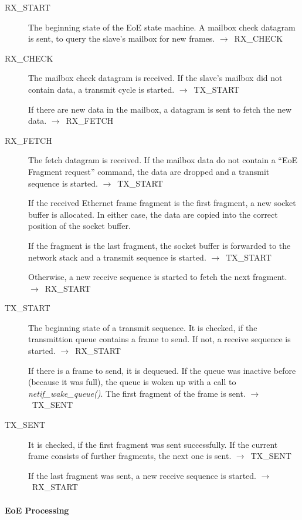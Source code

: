 \documentclass[a4paper,12pt,BCOR6mm,bibtotoc,idxtotoc]{scrbook}
\begin{document}
\begin{description}
\item[RX\_START] The beginning state of the EoE state machine. A
  mailbox check datagram is sent, to query the slave's mailbox for new
  frames. $\rightarrow$~RX\_CHECK

\item[RX\_CHECK] The mailbox check datagram is received. If the
  slave's mailbox did not contain data, a transmit cycle is started.
  $\rightarrow$~TX\_START

  If there are new data in the mailbox, a datagram is sent to fetch
  the new data. $\rightarrow$~RX\_FETCH

\item[RX\_FETCH] The fetch datagram is received. If the mailbox data
  do not contain a ``EoE Fragment request'' command, the data are
  dropped and a transmit sequence is started.
  $\rightarrow$~TX\_START

  If the received Ethernet frame fragment is the first fragment, a new
  socket buffer is allocated. In either case, the data are copied into
  the correct position of the socket buffer.

  If the fragment is the last fragment, the socket buffer is forwarded
  to the network stack and a transmit sequence is started.
  $\rightarrow$~TX\_START

  Otherwise, a new receive sequence is started to fetch the next
  fragment. $\rightarrow$~RX\_\-START

\item[TX\_START] The beginning state of a transmit sequence. It is
  checked, if the transmittion queue contains a frame to send. If not,
  a receive sequence is started. $\rightarrow$~RX\_START

  If there is a frame to send, it is dequeued. If the queue was
  inactive before (because it was full), the queue is woken up with a
  call to \textit{netif\_wake\_queue()}. The first fragment of the
  frame is sent. $\rightarrow$~TX\_SENT

\item[TX\_SENT] It is checked, if the first fragment was sent
  successfully. If the current frame consists of further fragments,
  the next one is sent. $\rightarrow$~TX\_SENT

  If the last fragment was sent, a new receive sequence is started.
  $\rightarrow$~RX\_START
\end{description}

\paragraph{EoE Processing}
\end{document}
